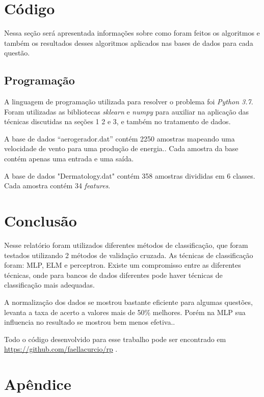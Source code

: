 \documentclass[paper=a4, fontsize=11pt]{scrartcl}
\numberwithin{equation}{section}		%
\numberwithin{figure}{section}			%
\numberwithin{table}{section}				%
\begin{document}
	\section{Código}
	
	Nessa seção será apresentada informações sobre como foram feitos os algoritmos e também os resultados desses algoritmos aplicados nas bases de dados para cada questão.
	
	\subsection{Programação}
	
	A linguagem de programação utilizada para resolver o problema foi \textit{Python 3.7}. Foram utilizadas as bibliotecas \textit{sklearn} e \textit{numpy} para auxiliar na aplicação das técnicas discutidas na seções 1 2 e 3, e também no tratamento de dados. 
	
	A base de dados “aerogerador.dat” contém 2250 amostras mapeando uma velocidade de vento para uma produção de energia.. Cada amostra da base contém apenas uma entrada e uma saída.
	
	A base de dados "Dermatology.dat" contém 358 amostras divididas em 6 classes. Cada amostra contém 34 \textit{features}.
    
	\section{Conclusão}
	
	Nesse relatório foram utilizados diferentes métodos de classificação, que foram testados utilizando 2 métodos de validação cruzada. As técnicas de classificação foram: MLP, ELM e perceptron.
	Existe um compromisso entre as diferentes técnicas, onde para bancos de dados diferentes pode haver técnicas de classificação mais adequadas.
	
	A normalização dos dados se mostrou bastante eficiente para algumas questões, levanta a taxa de acerto a valores mais de 50\% melhores. Porém na MLP sua influencia no resultado se mostrou bem menos efetiva..
	
	Todo o código desenvolvido para esse trabalho pode ser encontrado em \url{https://github.com/faellacurcio/rp} .
	
	\section{Apêndice}
	
\end{document}
